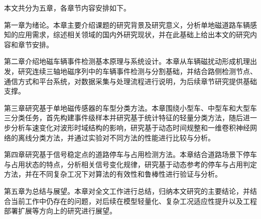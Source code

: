 本文共分为五章，各章节内容安排如下。

第一章为绪论。本章主要介绍课题的研究背景及研究意义，分析单地磁道路车辆感知的应用需求，综述相关领域的国内外研究现状，并在此基础上给出本文的研究内容和章节安排。

第二章介绍地磁车辆事件检测基本原理与系统设计。本章从车辆磁扰动形成机理出发，研究连续三轴地磁序列中的车辆事件检测与分割基础，并结合路侧检测节点、通信方式和平台系统，对数据采集与处理流程进行说明，为后续章节研究提供基础支撑。

第三章研究基于单地磁传感器的车型分类方法。本章围绕小型车、中型车和大型车三分类任务，首先构建事件级样本并研究基于统计特征的轻量分类方法，随后进一步分析车速变化对波形时域结构的影响，研究基于动态时间规整和一维卷积神经网络的离线分类方法，并通过实验对不同方法的性能进行比较与分析。

第四章研究基于信号稳定点的道路停车与占用检测方法。本章结合道路场景下停车与占用状态的特点，分析相关信号变化规律，研究基于动态参考的停车与占用判定方法，并在不同复杂工况下对算法的有效性和鲁棒性进行验证与分析。

第五章为总结与展望。本章对全文工作进行总结，归纳本文研究的主要结论，并结合当前工作中仍存在的问题，对后续在模型轻量化、复杂工况适应性提升以及工程部署扩展等方向上的研究进行展望。

